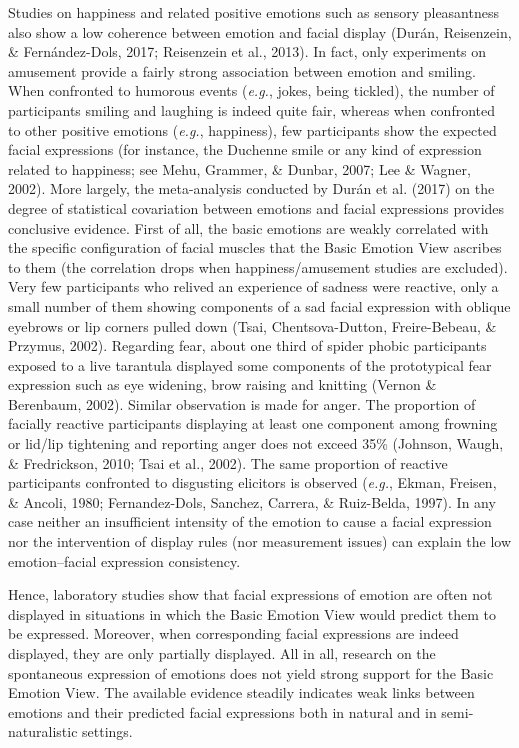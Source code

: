 \documentclass[man]{apa6}
\begin{document}
Studies on happiness and related positive emotions such as sensory pleasantness also show a low coherence between emotion and facial display (Durán, Reisenzein, \& Fernández-Dols, 2017; Reisenzein et al., 2013). In fact, only experiments on amusement provide a fairly strong association between emotion and smiling. When confronted to humorous events (\emph{e.g.}, jokes, being tickled), the number of participants smiling and laughing is indeed quite fair, whereas when confronted to other positive emotions (\emph{e.g.}, happiness), few participants show the expected facial expressions (for instance, the Duchenne smile or any kind of expression related to happiness; see Mehu, Grammer, \& Dunbar, 2007; Lee \& Wagner, 2002). More largely, the meta-analysis conducted by Durán et al. (2017) on the degree of statistical covariation between emotions and facial expressions provides conclusive evidence. First of all, the basic emotions are weakly correlated with the specific configuration of facial muscles that the Basic Emotion View ascribes to them (the correlation drops when happiness/amusement studies are excluded). Very few participants who relived an experience of sadness were reactive, only a small number of them showing components of a sad facial expression with oblique eyebrows or lip corners pulled down (Tsai, Chentsova-Dutton, Freire-Bebeau, \& Przymus, 2002). Regarding fear, about one third of spider phobic participants exposed to a live tarantula displayed some components of the prototypical fear expression such as eye widening, brow raising and knitting (Vernon \& Berenbaum, 2002). Similar observation is made for anger. The proportion of facially reactive participants displaying at least one component among frowning or lid/lip tightening and reporting anger does not exceed 35\% (Johnson, Waugh, \& Fredrickson, 2010; Tsai et al., 2002). The same proportion of reactive participants confronted to disgusting elicitors is observed (\emph{e.g.}, Ekman, Freisen, \& Ancoli, 1980; Fernandez-Dols, Sanchez, Carrera, \& Ruiz-Belda, 1997). In any case neither an insufficient intensity of the emotion to cause a facial expression nor the intervention of display rules (nor measurement issues) can explain the low emotion--facial expression consistency.

Hence, laboratory studies show that facial expressions of emotion are often not displayed in situations in which the Basic Emotion View would predict them to be expressed. Moreover, when corresponding facial expressions are indeed displayed, they are only partially displayed. All in all, research on the spontaneous expression of emotions does not yield strong support for the Basic Emotion View. The available evidence steadily indicates weak links between emotions and their predicted facial expressions both in natural and in semi-naturalistic settings.
\end{document}
